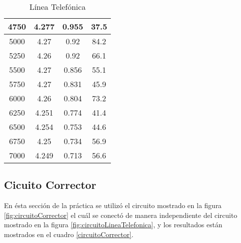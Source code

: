 \documentclass{article}
\begin{document}
\begin{table}[h!]
\begin{tabular}{|c|c|c|c|}
4750                & 4.277         & 0.955        & 37.5                 \\ \hline
5000                & 4.27          & 0.92         & 84.2                 \\ \hline
5250                & 4.26          & 0.92         & 66.1                 \\ \hline
5500                & 4.27          & 0.856        & 55.1                 \\ \hline
5750                & 4.27          & 0.831        & 45.9                 \\ \hline
6000                & 4.26          & 0.804        & 73.2                 \\ \hline
6250                & 4.251         & 0.774        & 41.4                 \\ \hline
6500                & 4.254         & 0.753        & 44.6                 \\ \hline
6750                & 4.25          & 0.734        & 56.9                 \\ \hline
7000                & 4.249         & 0.713        & 56.6                 \\ \hline
\end{tabular}

\caption{Línea Telefónica}
\label{lineaTelefonica}

\end{table}

\subsection{Cicuito Corrector}

En ésta sección de la práctica se utilizó el circuito mostrado en la figura \ref{fig:circuitoCorrector} el cuál se conectó de manera independiente del circuito mostrado en la figura \ref{fig:circuitoLineaTelefonica}, y los resultados están mostrados en el cuadro \ref{circuitoCorrector}.\\
\end{document}
